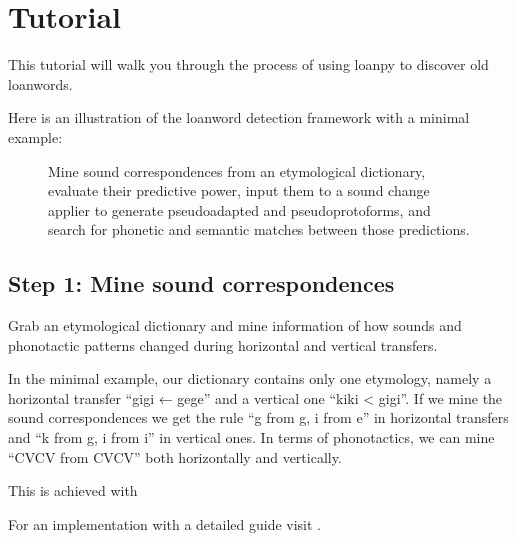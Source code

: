 \documentclass[letterpaper,10pt,english]{sphinxmanual}
\begin{document}
\sphinxstepscope


\chapter{Tutorial}
\label{\detokenize{tutorial:tutorial}}\label{\detokenize{tutorial::doc}}
\sphinxAtStartPar
This tutorial will walk you through the process of using loanpy to
discover old loanwords.

\sphinxAtStartPar
Here is an illustration of the loanword detection framework with a minimal
example:

\begin{figure}[htbp]
\centering
\capstart

\noindent{}
\caption{Mine sound
correspondences from an etymological dictionary, evaluate their predictive
power, input them to a sound change applier to generate pseudo\sphinxhyphen{}adapted and
pseudo\sphinxhyphen{}proto\sphinxhyphen{}forms, and search for phonetic and semantic matches between
those predictions.}\label{\detokenize{tutorial:id1}}\end{figure}


\section{Step 1: Mine sound correspondences}
\label{\detokenize{tutorial:step-1-mine-sound-correspondences}}
\sphinxAtStartPar
Grab an etymological dictionary and mine information of how sounds
and phonotactic patterns changed during horizontal and vertical transfers.

\sphinxAtStartPar
In the minimal example, our dictionary contains only one etymology, namely
a horizontal transfer “gigi ← gege” and a vertical one “kiki \textless{} gigi”.
If we mine the sound correspondences we get the rule “g from g, i from e”
in horizontal transfers and “k from g, i from i” in vertical ones.
In terms of phonotactics, we can mine “CVCV from CVCV” both horizontally
and vertically.

\sphinxAtStartPar
This is achieved with 

\sphinxAtStartPar
For an implementation with a detailed guide visit .
\end{document}
